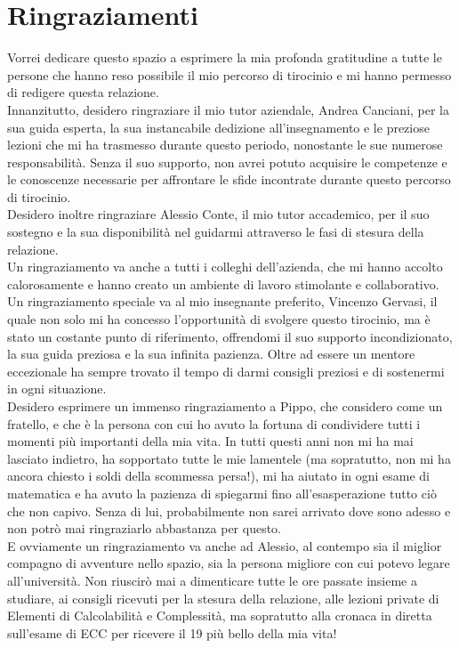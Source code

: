 \chapter*{Ringraziamenti}

Vorrei dedicare questo spazio a esprimere la mia profonda gratitudine a tutte le persone che hanno reso possibile il mio percorso di tirocinio e mi hanno permesso di redigere questa relazione.
\\Innanzitutto, desidero ringraziare il mio tutor aziendale, Andrea Canciani, per la sua guida esperta, la sua instancabile dedizione all'insegnamento e le preziose lezioni che mi ha trasmesso durante questo periodo, nonostante le sue numerose responsabilità. Senza il suo supporto, non avrei potuto acquisire le competenze e le conoscenze necessarie per affrontare le sfide incontrate durante questo percorso di tirocinio.
\\Desidero inoltre ringraziare Alessio Conte, il mio tutor accademico, per il suo sostegno e la sua disponibilità nel guidarmi attraverso le fasi di stesura della relazione.
\\Un ringraziamento va anche a tutti i colleghi dell'azienda, che mi hanno accolto calorosamente e hanno creato un ambiente di lavoro stimolante e collaborativo.
\\Un ringraziamento speciale va al mio insegnante preferito, Vincenzo Gervasi, il quale non solo mi ha concesso l'opportunità di svolgere questo tirocinio, ma è stato un costante punto di riferimento, offrendomi il suo supporto incondizionato, la sua guida preziosa e la sua infinita pazienza. Oltre ad essere un mentore eccezionale ha sempre trovato il tempo di darmi consigli preziosi e di sostenermi in ogni situazione.
\smallskip
\\Desidero esprimere un immenso ringraziamento a Pippo, che considero come un fratello, e che è la persona con cui ho avuto la fortuna di condividere tutti i momenti più importanti della mia vita. In tutti questi anni non mi ha mai lasciato indietro, ha sopportato tutte le mie lamentele (ma sopratutto, non mi ha ancora chiesto i soldi della scommessa persa!), mi ha aiutato in ogni esame di matematica e ha avuto la pazienza di spiegarmi fino all'esasperazione tutto ciò che non capivo. Senza di lui, probabilmente non sarei arrivato dove sono adesso e non potrò mai ringraziarlo abbastanza per questo.
\\E ovviamente un ringraziamento va anche ad Alessio, al contempo sia il miglior compagno di avventure nello spazio, sia la persona migliore con cui potevo legare all'università. Non riuscirò mai a dimenticare tutte le ore passate insieme a studiare, ai consigli ricevuti per la stesura della relazione, alle lezioni private di Elementi di Calcolabilità e Complessità, ma sopratutto alla cronaca in diretta sull'esame di ECC per ricevere il 19 più bello della mia vita! 
